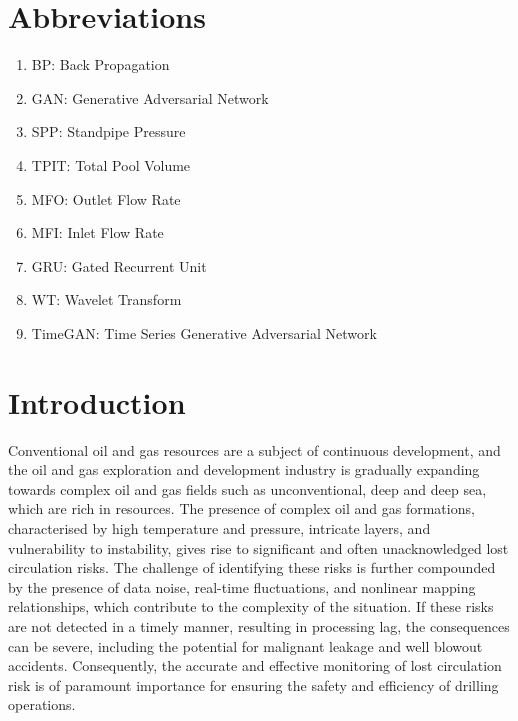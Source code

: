 \documentclass[journal,article,submit,pdftex,moreauthors]{Definitions/mdpi}
\begin{document}
\section*{Abbreviations}
\begin{enumerate}
    \item BP: Back Propagation
    \item GAN: Generative Adversarial Network
    \item SPP: Standpipe Pressure
    \item TPIT: Total Pool Volume
    \item MFO: Outlet Flow Rate
    \item MFI: Inlet Flow Rate
    \item GRU: Gated Recurrent Unit
    \item WT: Wavelet Transform
    \item TimeGAN: Time Series Generative Adversarial Network
\end{enumerate}
\section{Introduction}

Conventional oil and gas resources are a subject of continuous development, and the oil and gas exploration and development industry is gradually expanding towards complex oil and gas fields such as unconventional, deep and deep sea, which are rich in resources. The presence of complex oil and gas formations, characterised by high temperature and pressure, intricate layers, and vulnerability to instability, gives rise to significant and often unacknowledged lost circulation risks. The challenge of identifying these risks is further compounded by the presence of data noise, real-time fluctuations, and nonlinear mapping relationships, which contribute to the complexity of the situation. If these risks are not detected in a timely manner, resulting in processing lag, the consequences can be severe, including the potential for malignant leakage and well blowout accidents. Consequently, the accurate and effective monitoring of lost circulation risk is of paramount importance for ensuring the safety and efficiency of drilling operations.
\end{document}
